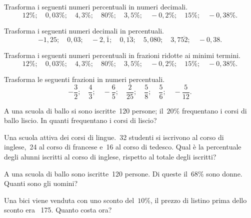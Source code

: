 \begin{esercizio}
 \label{ese:3.79}
Trasforma i seguenti numeri percentuali in numeri decimali.
\[12\%;\quad0,03\%;\quad4,3\%;\quad80\%;\quad3,5\%;\quad-0,2\%;\quad15\%;
\quad-0,38\%.\]
\end{esercizio}

\begin{esercizio}
 \label{ese:3.80}
Trasforma i seguenti numeri decimali in percentuali.
\[-1,25;\quad0,03;\quad-2,\overline{1};\quad0,\overline{13};\quad5,080;
\quad3,7\overline{52};\quad-0,38.\]
\end{esercizio}

\begin{esercizio}
 \label{ese:3.81}
Trasforma i seguenti numeri percentuali in frazioni ridotte ai minimi termini.
\[12\%;\quad0,03\%;\quad4,3\%;\quad80\%;\quad3,5\%;\quad-0,2\%;\quad15\%;
\quad-0,38\%.\]
\end{esercizio}

\begin{esercizio}
\label{ese:3.82}
Trasforma le seguenti frazioni in numeri percentuali.
\[-\frac{3}{2};\quad\frac{4}{3};\quad-\frac{6}{5};\quad\frac{2}{25};
\quad\frac{5}{8};\quad\frac{5}{6};\quad-\frac{5}{12}.\]
\end{esercizio}

\begin{esercizio}
 \label{ese:3.83}
A una scuola di ballo si sono iscritte~120 persone; il~$20\%$ frequentano i 
corsi di ballo liscio. In quanti frequentano i corsi di liscio?
\end{esercizio}

\begin{esercizio}
 \label{ese:3.84}
Una scuola attiva dei corsi di lingue.~32 studenti si iscrivono al corso di 
inglese,~24 al corso di francese e~16 al corso di tedesco.
Qual è la percentuale degli alunni iscritti al corso di inglese, rispetto al 
totale degli iscritti?
\end{esercizio}

\begin{esercizio}
 \label{ese:3.85}
A una scuola di ballo sono iscritte~120 persone. Di queste il~$68\%$ sono 
donne. Quanti sono gli uomini?
\end{esercizio}

\begin{esercizio}
 \label{ese:3.86}
 Una bici viene venduta con uno sconto del~$10\%$, il prezzo di listino 
 prima dello sconto era \officialeuro\ 175. Quanto costa ora?
\end{esercizio}

